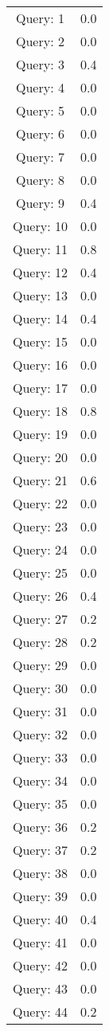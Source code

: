 \begin{table}
\centering
\begin{tabular}{cc}
Query: 1&0.0
\\
Query: 2&0.0
\\
Query: 3&0.4
\\
Query: 4&0.0
\\
Query: 5&0.0
\\
Query: 6&0.0
\\
Query: 7&0.0
\\
Query: 8&0.0
\\
Query: 9&0.4
\\
Query: 10&0.0
\\
Query: 11&0.8
\\
Query: 12&0.4
\\
Query: 13&0.0
\\
Query: 14&0.4
\\
Query: 15&0.0
\\
Query: 16&0.0
\\
Query: 17&0.0
\\
Query: 18&0.8
\\
Query: 19&0.0
\\
Query: 20&0.0
\\
Query: 21&0.6
\\
Query: 22&0.0
\\
Query: 23&0.0
\\
Query: 24&0.0
\\
Query: 25&0.0
\\
Query: 26&0.4
\\
Query: 27&0.2
\\
Query: 28&0.2
\\
Query: 29&0.0
\\
Query: 30&0.0
\\
Query: 31&0.0
\\
Query: 32&0.0
\\
Query: 33&0.0
\\
Query: 34&0.0
\\
Query: 35&0.0
\\
Query: 36&0.2
\\
Query: 37&0.2
\\
Query: 38&0.0
\\
Query: 39&0.0
\\
Query: 40&0.4
\\
Query: 41&0.0
\\
Query: 42&0.0
\\
Query: 43&0.0
\\
Query: 44&0.2
\\

\end{tabular}
\end{table}
